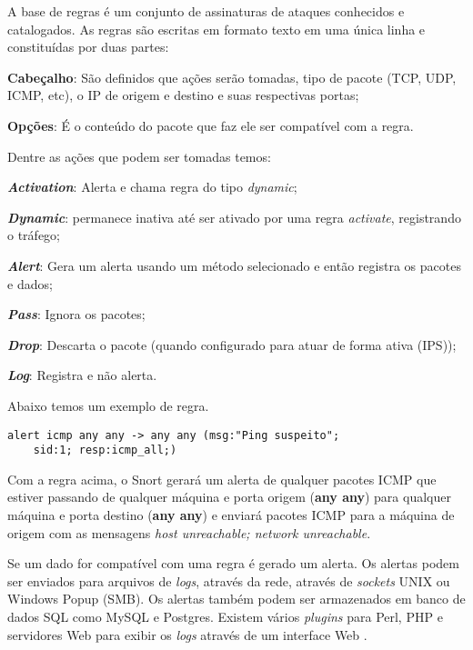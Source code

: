 A base de regras é um conjunto de assinaturas de ataques conhecidos e catalogados. As regras são escritas em formato texto em uma única linha e constituídas por duas partes: 

\begin{alineas}
\item \textbf{Cabeçalho}: São definidos que ações serão tomadas, tipo de pacote (TCP, UDP, ICMP, etc), o IP de origem e destino e suas respectivas portas;
\item \textbf{Opções}: É o conteúdo do pacote que faz ele ser compatível com a regra.
\end{alineas}

Dentre as ações que podem ser tomadas temos:

\begin{alineas}
\item \textbf{\textit{Activation}}: Alerta e chama regra do tipo \textit{dynamic};
\item \textbf{\textit{Dynamic}}: permanece inativa até ser ativado por uma regra \textit{activate}, registrando o tráfego;
\item \textbf{\textit{Alert}}: Gera um alerta usando um método selecionado e então registra os pacotes e dados;
\item \textbf{\textit{Pass}}: Ignora os pacotes;
\item \textbf{\textit{Drop}}: Descarta o pacote (quando configurado para atuar de forma ativa (IPS)); 
\item \textbf{\textit{Log}}: Registra e não alerta.
\end{alineas}

Abaixo temos um exemplo de regra.

\begin{lstlisting}[frame=single]
    alert icmp any any -> any any (msg:"Ping suspeito"; 
    sid:1; resp:icmp_all;)
\end{lstlisting}

Com a regra acima, o Snort gerará um alerta de qualquer pacotes ICMP que estiver passando de qualquer máquina e porta origem (\textbf{any any}) para qualquer máquina e porta destino (\textbf{any any}) e enviará pacotes ICMP para a máquina de origem com as mensagens \textit{host unreachable; network unreachable}.

Se um dado for compatível com uma regra é gerado um alerta. Os alertas podem ser enviados para arquivos de \textit{logs}, através da rede, através de \textit{sockets} UNIX ou Windows Popup (SMB). Os alertas também podem ser armazenados em banco de dados SQL como MySQL e Postgres. Existem vários \textit{plugins} para Perl, PHP e servidores Web para exibir os \textit{logs} através de um interface Web \cite{snort:andrew}.

